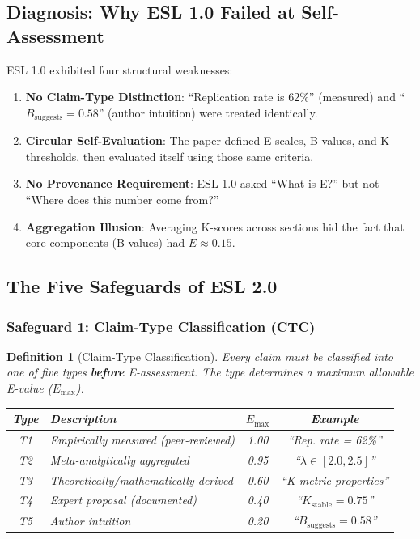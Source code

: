 \documentclass[11pt,a4paper]{article}
\newtheorem{definition}{Definition}[section]
\begin{document}
\subsection{Diagnosis: Why ESL 1.0 Failed at Self-Assessment}

ESL 1.0 exhibited four structural weaknesses:

\begin{enumerate}
    \item \textbf{No Claim-Type Distinction}: ``Replication rate is 62\%'' (measured) and ``$B_{\text{suggests}} = 0.58$'' (author intuition) were treated identically.

    \item \textbf{Circular Self-Evaluation}: The paper defined E-scales, B-values, and K-thresholds, then evaluated itself using those same criteria.

    \item \textbf{No Provenance Requirement}: ESL 1.0 asked ``What is E?'' but not ``Where does this number come from?''

    \item \textbf{Aggregation Illusion}: Averaging K-scores across sections hid the fact that core components (B-values) had $E \approx 0.15$.
\end{enumerate}

\subsection{The Five Safeguards of ESL 2.0}

\subsubsection{Safeguard 1: Claim-Type Classification (CTC)}

\begin{definition}[Claim-Type Classification]
\label{def:ctc}
Every claim must be classified into one of five types \textbf{before} E-assessment. The type determines a maximum allowable E-value ($E_{\max}$).

\begin{center}
\begin{tabular}{clcc}
\toprule
\textbf{Type} & \textbf{Description} & \textbf{$E_{\max}$} & \textbf{Example} \\
\midrule
T1 & Empirically measured (peer-reviewed) & 1.00 & ``Rep. rate = 62\%'' \\
T2 & Meta-analytically aggregated & 0.95 & ``$\lambda \in [2.0, 2.5]$'' \\
T3 & Theoretically/mathematically derived & 0.60 & ``K-metric properties'' \\
T4 & Expert proposal (documented) & 0.40 & ``$K_{\text{stable}} = 0.75$'' \\
T5 & Author intuition & 0.20 & ``$B_{\text{suggests}} = 0.58$'' \\
\bottomrule
\end{tabular}
\end{center}
\end{definition}
\end{document}
